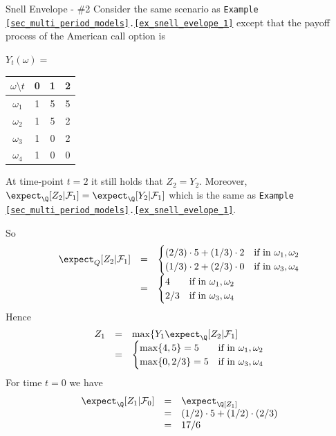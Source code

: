 \documentclass[11pt,a4paper]{article}
\begin{document}
  \begin{example}{Snell Envelope - \#2}
    Consider the same scenario as \texttt{Example \ref{sec_multi_period_models}.\ref{ex_snell_evelope_1}} except that the payoff process of the American call option is
    \begin{center}
      $Y_t(\omega)=$\begin{tabular}{c|ccc}
        $\omega\setminus t$&0&1&2\\\hline
        $\omega_1$&1&5&5\\
        $\omega_2$&1&5&2\\
        $\omega_3$&1&0&2\\
        $\omega_4$&1&0&0
      \end{tabular}
    \end{center}
    At time-point $t=2$ it still holds that $Z_2=Y_2$. Moreover, $\expect_\Q[Z_2|\mathcal{F}_1]=\expect_\Q[Y_2|\mathcal{F}_1]$ which is the same as \texttt{Example \ref{sec_multi_period_models}.\ref{ex_snell_evelope_1}}.
    \par So
    \[\begin{array}{rcl}
      \expect_Q[Z_2|\mathcal{F}_1]&=&\begin{cases}
        (2/3)\cdot5+(1/3)\cdot2&\text{if in }\omega_1,\omega_2\\
        (1/3)\cdot2+(2/3)\cdot0&\text{if in }\omega_3,\omega_4
      \end{cases}\\
      &=&\begin{cases}
        4&\text{if in }\omega_1,\omega_2\\
        2/3&\text{if in }\omega_3,\omega_4
      \end{cases}
    \end{array}\]
    Hence
    \[\begin{array}{rcl}
      Z_1&=&\max\{Y_1\expect_\Q[Z_2|\mathcal{F}_1]\\
      &=&\begin{cases}
        \max\{4,5\}=5&\text{if in }\omega_1,\omega_2\\
        \max\{0,2/3\}=5&\text{if in }\omega_3,\omega_4
      \end{cases}
    \end{array}\]
    For time $t=0$ we have
    \[\begin{array}{rcl}
      \expect_\Q[Z_1|\mathcal{F}_0]&=&\expect_\Q[Z_1]\\
      &=&(1/2)\cdot5+(1/2)\cdot(2/3)\\
      &=&17/6
    \end{array}\]

\end{example}
\end{document}
